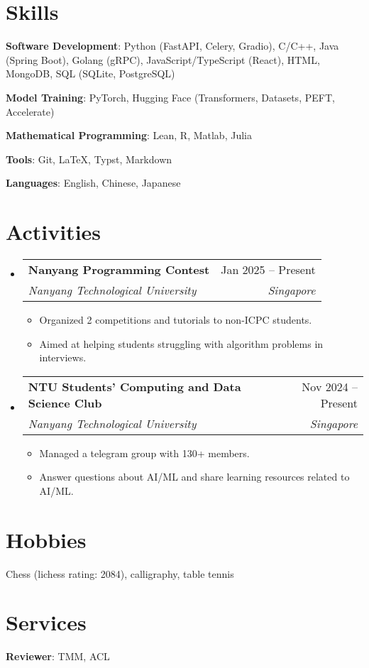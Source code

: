 \documentclass[letterpaper,10pt]{article}
\makeatletter
\newcommand{\resumeItem}[1]{
  \item\small{
    {#1 \vspace{-2pt}}
  }
}
\newcommand{\resumeSubheading}[4]{
  \vspace{-3pt}\item
    \begin{tabular*}{0.97\textwidth}[t]{l@{\extracolsep{\fill}}r}
      \textbf{#1} & #2 \\
      \textit{\small#3} & \textit{\small #4} \\
    \end{tabular*}\vspace{-7pt}
}
\newcommand{\resumeSubHeadingListStart}{\begin{itemize}[leftmargin=0.15in, label={}]}
\newcommand{\resumeSubHeadingListEnd}{\end{itemize}}
\newcommand{\resumeItemListStart}{\begin{itemize}}
\newcommand{\resumeItemListEnd}{\end{itemize}\vspace{-5pt}}
\makeatother
\begin{document}
\section{Skills}

\textbf{Software Development}: Python (FastAPI, Celery, Gradio), C/C++, Java (Spring Boot), Golang (gRPC), JavaScript/TypeScript (React), HTML, MongoDB, SQL (SQLite, PostgreSQL)

\textbf{Model Training}: PyTorch, Hugging Face (Transformers, Datasets, PEFT, Accelerate)

\textbf{Mathematical Programming}: Lean, R, Matlab, Julia

\textbf{Tools}: Git, \LaTeX, Typst, Markdown

\textbf{Languages}: English, Chinese, Japanese

\section{Activities}
  \resumeSubHeadingListStart
    \resumeSubheading
      {Nanyang Programming Contest}{Jan 2025 -- Present}
      {Nanyang Technological University}{Singapore}
      \resumeItemListStart
        \resumeItem{Organized 2 competitions and tutorials to non-ICPC students.}
        \resumeItem{Aimed at helping students struggling with algorithm problems in interviews.}
      \resumeItemListEnd

    \resumeSubheading
      {NTU Students' Computing and Data Science Club}{Nov 2024 -- Present}
      {Nanyang Technological University}{Singapore}
      \resumeItemListStart
        \resumeItem{Managed a telegram group with 130+ members.}
        \resumeItem{Answer questions about AI/ML and share learning resources related to AI/ML.}
      \resumeItemListEnd
  \resumeSubHeadingListEnd

\section{Hobbies}

Chess (lichess rating: 2084), calligraphy, table tennis

\section{Services}

\textbf{Reviewer}: TMM, ACL

\end{document}
